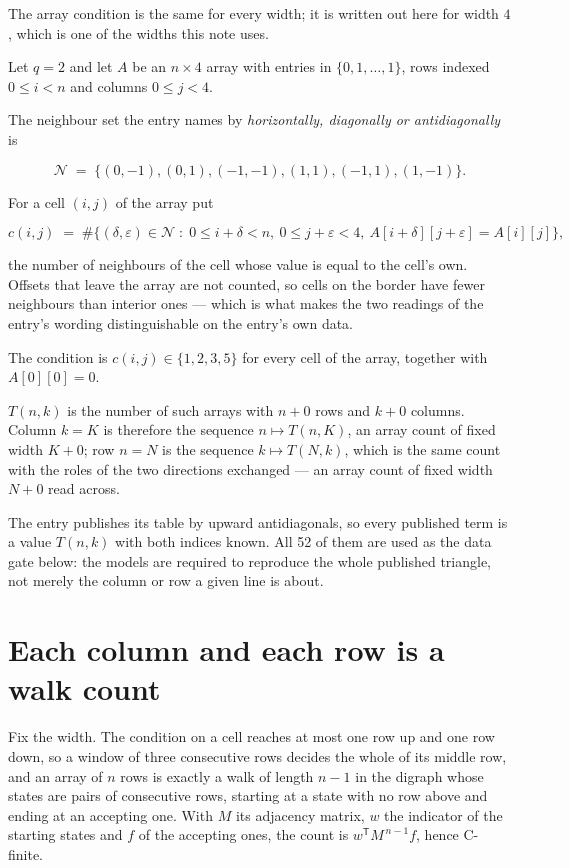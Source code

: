 \documentclass[11pt]{article}
\theoremstyle{definition}
\begin{document}
The array condition is the same for every width; it is written out here for width $4$, which is one of the widths this note uses.

Let $q = 2$ and let $A$ be an $n \times 4$ array with entries in $\{0,1,\dots,1\}$, rows indexed $0 \le i < n$ and columns $0 \le j < 4$.

The neighbour set the entry names by {\itshape horizontally, diagonally or antidiagonally} is

\[\mathcal{N} \;=\; \{(0,-1), (0,1), (-1,-1), (1,1), (-1,1), (1,-1)\}.\]

For a cell $(i,j)$ of the array put

\[c(i,j) \;=\; \#\bigl\{(\delta,\varepsilon)\in\mathcal{N} \;:\; 0\le i+\delta<n,\ 0\le j+\varepsilon<4,\ A[i+\delta][j+\varepsilon] = A[i][j]\bigr\},\]

the number of neighbours of the cell whose value is equal to the cell's own. Offsets that leave the array are not counted, so cells on the border have fewer neighbours than interior ones --- which is what makes the two readings of the entry's wording distinguishable on the entry's own data.

The condition is $c(i,j) \in \{1, 2, 3, 5\}$ for every cell of the array, together with $A[0][0]=0$.

$T(n,k)$ is the number of such arrays with $n + 0$ rows and $k + 0$ columns. Column $k = K$ is therefore the sequence $n \mapsto T(n,K)$, an array count of fixed width $K + 0$; row $n = N$ is the sequence $k \mapsto T(N,k)$, which is the same count with the roles of the two directions exchanged --- an array count of fixed width $N + 0$ read across.

The entry publishes its table by upward antidiagonals, so every published term is a value $T(n,k)$ with both indices known. All 52 of them are used as the data gate below: the models are required to reproduce the whole published triangle, not merely the column or row a given line is about.

\section{Each column and each row is a walk count}

Fix the width. The condition on a cell reaches at most one row up and one row down, so a window of three consecutive rows decides the whole of its middle row, and an array of $n$ rows is exactly a walk of length $n-1$ in the digraph whose states are pairs of consecutive rows, starting at a state with no row above and ending at an accepting one. With $M$ its adjacency matrix, $w$ the indicator of the starting states and $f$ of the accepting ones, the count is $w^{\mathsf T}M^{\,n-1}f$, hence C-finite.
\end{document}
